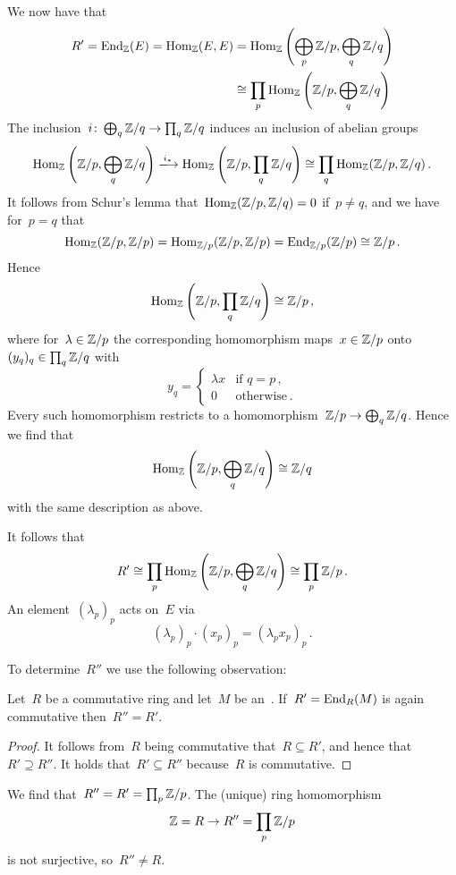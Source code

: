 We now have that
\begin{align*}
          R'
   =      \operatorname{End}_{\mathbb{Z}}(E)
   =      \operatorname{Hom}_{\mathbb{Z}}(E, E)
  &=      \operatorname{Hom}_{\mathbb{Z}}\left( \bigoplus_p \mathbb{Z}/p , \bigoplus_q \mathbb{Z}/q \right) \\
  &\cong  \prod_p \operatorname{Hom}_{\mathbb{Z}} \left( \mathbb{Z}/p, \bigoplus_q \mathbb{Z}/q \right)
\end{align*}
The inclusion~$i \colon \bigoplus_q \mathbb{Z}/q \to \prod_q \mathbb{Z}/q$ induces an inclusion of abelian groups
\[
                \Hom_\Integer \left( \Integer/p, \bigoplus_q \Integer/q \right)
  \xlongto{i_*} \Hom_\Integer \left( \Integer/p, \prod_q \Integer/q \right)
  \cong         \prod_q \Hom_\Integer( \Integer/p, \Integer/q ) \,.
\]
It follows from Schur’s lemma that~$\operatorname{Hom}_{\mathbb{Z}}(\mathbb{Z}/p, \mathbb{Z}/q) = 0$ if~$p \neq q$, and we have for~$p = q$ that
\[
        \operatorname{Hom}_{\mathbb{Z}}( \mathbb{Z}/p, \mathbb{Z}/p )
  =     \operatorname{Hom}_{\mathbb{Z}/p}( \mathbb{Z}/p, \mathbb{Z}/p )
  =     \operatorname{End}_{\mathbb{Z}/p}( \mathbb{Z}/p )
  \cong \mathbb{Z}/p \,.
\]
Hence
\[
        \operatorname{Hom}_{\mathbb{Z}} \left( \mathbb{Z}/p, \prod_q \mathbb{Z}/q \right)
  \cong \mathbb{Z}/p \,,
\]
where for~$\lambda \in \mathbb{Z}/p$ the corresponding homomorphism maps~$x \in \mathbb{Z}/p$ onto~$(y_q)_q \in \prod_q \mathbb{Z}/q$ with
\[
    y_q
  = \begin{cases}
      \lambda x & \text{if~$q = p$} \,, \\
      0         & \text{otherwise} \,.
    \end{cases}
\]
Every such homomorphism restricts to a homomorphism~$\mathbb{Z}/p \to \bigoplus_q \mathbb{Z}/q$.
Hence we find that
\[
        \operatorname{Hom}_{\mathbb{Z}} \left( \mathbb{Z}/p, \bigoplus_q \mathbb{Z}/q \right)
  \cong \mathbb{Z}/q
\]
with the same description as above.

It follows that
\[
        R'
  \cong \prod_p \operatorname{Hom}_{\mathbb{Z}} \left( \mathbb{Z}/p, \bigoplus_q \mathbb{Z}/q \right)
  \cong \prod_p \mathbb{Z}/p \,.
\]
An element~$(\lambda_p)_p$ acts on~$E$ via
\[
    (\lambda_p)_p \cdot (x_p)_p
  = (\lambda_p x_p)_p \,.
\]

To determine~$R''$ we use the following observation:

\begin{lemma}
  Let~$R$ be a commutative ring and let~$M$ be an~{}.
  If~$R' = \operatorname{End}_R(M)$ is again commutative then~$R'' = R'$.
\end{lemma}

\begin{proof}
  It follows from~$R$ being commutative that~$R \subseteq R'$, and hence that~$R' \supseteq R''$.
  It holds that~$R' \subseteq R''$ because~$R$ is commutative.
\end{proof}

We find that~$R'' = R' = \prod_p \mathbb{Z}/p$.
The (unique) ring homomorphism
\[
      \mathbb{Z}
  =   R
  \to R''
  =   \prod_p \mathbb{Z}/p
\]
is not surjective, so~$R'' \neq R$.



